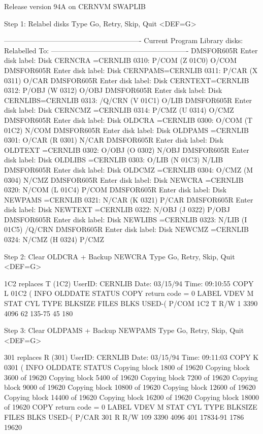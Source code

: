 \begin{XMPt}{Release version 94A on CERNVM}
 SWAPLIB
 
 Step 1: Relabel disks
 Type Go, Retry, Skip, Quit <DEF=G>
 
 ----------------------------------------------------------
 Current Program Library disks:              Relabelled To:
 ----------------------------------------------------------
 DMSFOR605R Enter disk label:
 Disk CERNCRA =CERNLIB 0310: P/COM (Z 01C0)     O/COM
 DMSFOR605R Enter disk label:
 Disk CERNPAMS=CERNLIB 0311: P/CAR (X 0311)     O/CAR
 DMSFOR605R Enter disk label:
 Disk CERNTEXT=CERNLIB 0312: P/OBJ (W 0312)     O/OBJ
 DMSFOR605R Enter disk label:
 Disk CERNLIBS=CERNLIB 0313: /Q/CRN (V 01C1)     O/LIB
 DMSFOR605R Enter disk label:
 Disk CERNCMZ =CERNLIB 0314: P/CMZ (U 0314)     O/CMZ
 DMSFOR605R Enter disk label:
 Disk OLDCRA  =CERNLIB 0300: O/COM (T 01C2)     N/COM
 DMSFOR605R Enter disk label:
 Disk OLDPAMS =CERNLIB 0301: O/CAR (R 0301)     N/CAR
 DMSFOR605R Enter disk label:
 Disk OLDTEXT =CERNLIB 0302: O/OBJ (O 0302)     N/OBJ
 DMSFOR605R Enter disk label:
 Disk OLDLIBS =CERNLIB 0303: O/LIB (N 01C3)     N/LIB
 DMSFOR605R Enter disk label:
 Disk OLDCMZ  =CERNLIB 0304: O/CMZ (M 0304)     N/CMZ
 DMSFOR605R Enter disk label:
 Disk NEWCRA  =CERNLIB 0320: N/COM (L 01C4)     P/COM
 DMSFOR605R Enter disk label:
 Disk NEWPAMS =CERNLIB 0321: N/CAR (K 0321)     P/CAR
 DMSFOR605R Enter disk label:
 Disk NEWTEXT =CERNLIB 0322: N/OBJ (J 0322)     P/OBJ
 DMSFOR605R Enter disk label:
 Disk NEWLIBS =CERNLIB 0323: N/LIB (I 01C5)     /Q/CRN
 DMSFOR605R Enter disk label:
 Disk NEWCMZ  =CERNLIB 0324: N/CMZ (H 0324)     P/CMZ
 
 Step 2: Clear OLDCRA + Backup NEWCRA
 Type Go, Retry, Skip, Quit <DEF=G>
 
 1C2 replaces T (1C2)
 UserID: CERNLIB   Date: 03/15/94  Time: 09:10:55
 COPY     L        01C2     (        INFO     OLDDATE  STATUS
 COPY     return code =   0
 LABEL  VDEV M  STAT  CYL TYPE BLKSIZE  FILES  BLKS USED-(%
 P/COM  1C2  T   R/W    1 3390 4096        62        135-75         45        180
 
 Step 3: Clear OLDPAMS + Backup NEWPAMS
 Type Go, Retry, Skip, Quit <DEF=G>
 
 301 replaces R (301)
 UserID: CERNLIB   Date: 03/15/94  Time: 09:11:03
 COPY     K        0301     (        INFO     OLDDATE  STATUS
 Copying block    1800 of   19620
 Copying block    3600 of   19620
 Copying block    5400 of   19620
 Copying block    7200 of   19620
 Copying block    9000 of   19620
 Copying block   10800 of   19620
 Copying block   12600 of   19620
 Copying block   14400 of   19620
 Copying block   16200 of   19620
 Copying block   18000 of   19620
 COPY     return code =   0
 LABEL  VDEV M  STAT  CYL TYPE BLKSIZE  FILES  BLKS USED-(%
 P/CAR  301  R   R/W  109 3390 4096       401      17834-91       1786      19620
 

\end{XMPt}
